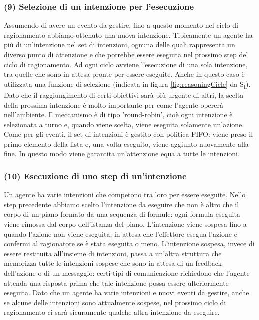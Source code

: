 \documentclass[12pt,a4paper,openright,twoside]{report}
\begin{document}
\subsubsection{(9) Selezione di un intenzione per l'esecuzione}
Assumendo di avere un evento da gestire, fino a questo momento nel ciclo di ragionamento abbiamo ottenuto una nuova intenzione. Tipicamente un agente ha pi\`u di un'intenzione nel set di intenzioni, ognuna delle quali rappresenta un diverso punto di attenzione e che potrebbe essere eseguita nel prossimo step del ciclo di ragionamento. Ad ogni ciclo avviene l'esecuzione di una sola intenzione, tra quelle che sono in attesa pronte per essere eseguite. Anche in questo caso \`e utilizzata una funzione di selezione (indicata in figura \ref{fig:reasoningCicle} da S\textsubscript{I}). Dato che il raggiungimento di certi obiettivi sar\`a pi\`u urgente di altri, la scelta della prossima intenzione \`e molto importante per come l'agente operer\`a nell'ambiente.
Il meccanismo \`e di tipo 'round-robin', cio\`e ogni intenzione \`e selezionata a turno e, quando viene scelta, viene eseguita solamente un'azione. Come per gli eventi, il set di intenzioni \`e gestito con politica FIFO: viene preso il primo elemento della lista e, una volta eseguito, viene aggiunto nuovamente alla fine. In questo modo viene garantita un'attenzione equa a tutte le intenzioni.


\subsubsection{(10) Esecuzione di uno step di un'intenzione}
Un agente ha varie intenzioni che competono tra loro per essere eseguite. Nello step precedente abbiamo scelto l'intenzione da eseguire che non \`e altro che il corpo di un piano formato da una sequenza di formule: ogni formula eseguita viene rimossa dal corpo dell'istanza del piano.
L'intenzione viene sospesa fino a quando l'azione non viene eseguita, in attesa che l'effettore esegua l'azione e confermi al ragionatore se \`e stata eseguita o meno. L'intenzione sospesa, invece di essere restituita all'insieme di intenzioni, passa a un'altra struttura che memorizza tutte le intenzioni sospese che sono in attesa di un feedback dell'azione o di un messaggio: certi tipi di comunicazione richiedono che l'agente attenda una risposta prima che tale intenzione possa essere ulteriormente eseguita. Dato che un agente ha varie intenzioni e nuovi eventi da gestire, anche se alcune delle intenzioni sono attualmente sospese, nel prossimo ciclo di ragionamento ci sar\`a sicuramente qualche altra intenzione da eseguire.
\end{document}

